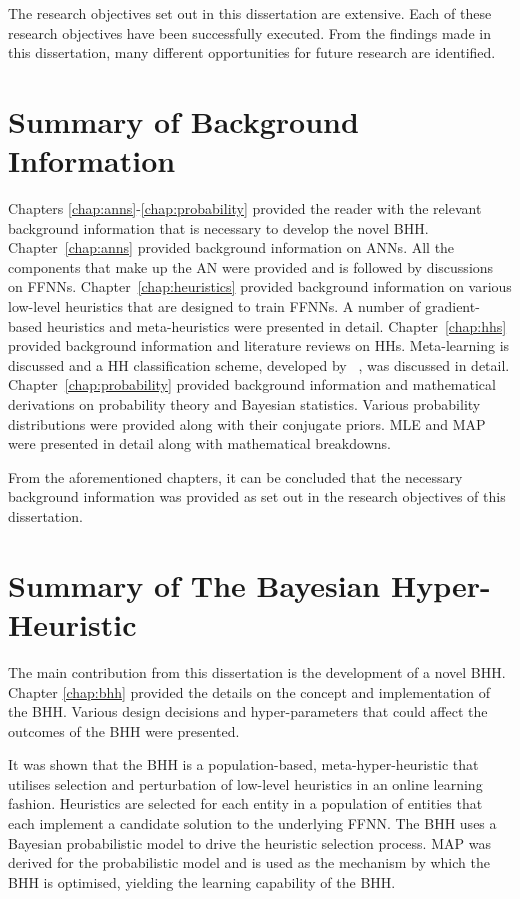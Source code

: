 The research objectives set out in this dissertation are extensive. Each of these research objectives have been successfully executed. From the findings made in this dissertation, many different opportunities for future research are identified.


\section{Summary of Background Information}
\label{sec:conclusion:background_info}

Chapters \ref{chap:anns}-\ref{chap:probability} provided the reader with the relevant background information that is necessary to develop the novel \acs{BHH}. Chapter~\ref{chap:anns} provided background information on \acp{ANN}. All the components that make up the \acs{AN} were provided and is followed by discussions on \acp{FFNN}. Chapter~\ref{chap:heuristics} provided background information on various low-level heuristics that are designed to train \acp{FFNN}. A number of gradient-based heuristics and meta-heuristics were presented in detail. Chapter~\ref{chap:hhs} provided background information and literature reviews on \acp{HH}. Meta-learning is discussed and a \acs{HH} classification scheme, developed by \citeauthor{ref:burke:2010}~\cite{ref:burke:2010}, was discussed in detail. Chapter~\ref{chap:probability} provided background information and mathematical derivations on probability theory and Bayesian statistics. Various probability distributions were provided along with their conjugate priors. \acs{MLE} and \acs{MAP} were presented in detail along with mathematical breakdowns.

From the aforementioned chapters, it can be concluded that the necessary background information was provided as set out in the research objectives of this dissertation.


\section{Summary of The Bayesian Hyper-Heuristic}
\label{sec:conclusion:bhh}

The main contribution from this dissertation is the development of a novel \acf{BHH}. Chapter \ref{chap:bhh} provided the details on the concept and implementation of the \ac{BHH}. Various design decisions and hyper-parameters that could affect the outcomes of the \ac{BHH} were presented.

It was shown that the \acs{BHH} is a population-based, meta-hyper-heuristic that utilises selection and perturbation of low-level heuristics in an online learning fashion. Heuristics are selected for each entity in a population of entities that each implement a candidate solution to the underlying \acs{FFNN}. The \acs{BHH} uses a Bayesian probabilistic model to drive the heuristic selection process. \acs{MAP} was derived for the probabilistic model and is used as the mechanism by which the \acs{BHH} is optimised, yielding the learning capability of the \acs{BHH}.

